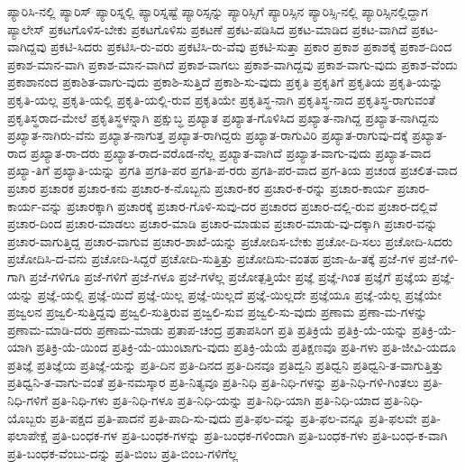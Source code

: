 {ಪ್ಯಾರಿಸಿ-ನಲ್ಲಿ
ಪ್ಯಾರಿಸ್
ಪ್ಯಾರಿಸ್ನಲ್ಲಿ
ಪ್ಯಾರಿಸ್ನಷ್ಟೆ
ಪ್ಯಾರಿಸ್ಸನ್ನು
ಪ್ಯಾರಿಸ್ಸಿಗೆ
ಪ್ಯಾರಿಸ್ಸಿನ
ಪ್ಯಾರಿಸ್ಸಿ-ನಲ್ಲಿ
ಪ್ಯಾರಿಸ್ಸಿನಲ್ಲಿದ್ದಾಗ
ಪ್ಯಾಲೇಸ್
ಪ್ರಕಟಗೊಳಿಸ-ಬೇಕು
ಪ್ರಕಟಗೊಳಿಸು
ಪ್ರಕಟಣೆ
ಪ್ರಕಟ-ಪಡಿಸಿದ
ಪ್ರಕಟ-ಮಾಡಿದ
ಪ್ರಕಟ-ವಾಗಿದೆ
ಪ್ರಕಟ-ವಾಗಿದ್ದವು
ಪ್ರಕಟಿ-ಸಿದರು
ಪ್ರಕಟಿಸಿ-ರು-ವರು
ಪ್ರಕಟಿಸಿ-ರು-ವೆವು
ಪ್ರಕಟಿ-ಸುತ್ತಾ
ಪ್ರಕಾರ
ಪ್ರಕಾಶ
ಪ್ರಕಾಶಕ್ಕೆ
ಪ್ರಕಾಶ-ದಿಂದ
ಪ್ರಕಾಶ-ಮಾನ-ವಾಗಿ
ಪ್ರಕಾಶ-ಮಾನ-ವಾಗಿದೆ
ಪ್ರಕಾಶ-ವಾಗಲು
ಪ್ರಕಾಶ-ವಾಗಿದ್ದವು
ಪ್ರಕಾಶ-ವಾಗು-ವುದು
ಪ್ರಕಾಶ-ವೆಂದು
ಪ್ರಕಾಶಾನಂದ
ಪ್ರಕಾಶಿತ-ವಾಗು-ವುದು
ಪ್ರಕಾಶಿ-ಸುತ್ತಿದೆ
ಪ್ರಕಾಶಿ-ಸು-ವುದು
ಪ್ರಕೃತಿ
ಪ್ರಕೃತಿಗೆ
ಪ್ರಕೃತಿಯ
ಪ್ರಕೃತಿ-ಯನ್ನು
ಪ್ರಕೃತಿ-ಯಲ್ಲ
ಪ್ರಕೃತಿ-ಯಲ್ಲಿ
ಪ್ರಕೃತಿ-ಯಲ್ಲಿ-ರುವ
ಪ್ರಕೃತಿಯೇ
ಪ್ರಕೃತಿಸ್ಥ-ನಾಗಿ
ಪ್ರಕೃತಿಸ್ಥ-ನಾದ
ಪ್ರಕೃತಿಸ್ಥ-ರಾಗುವಂತೆ
ಪ್ರಕೃತಿಸ್ಥರಾದ-ಮೇಲೆ
ಪ್ರಕೃತಿಸ್ಥಳನ್ನಾಗಿ
ಪ್ರಕ್ಷುಬ್ಧ
ಪ್ರಖ್ಯಾತ
ಪ್ರಖ್ಯಾತ-ಗೊಳಿಸಿದ
ಪ್ರಖ್ಯಾತ-ನಾಗಿದ್ದ
ಪ್ರಖ್ಯಾತ-ನಾಗಿದ್ದನು
ಪ್ರಖ್ಯಾತ-ನಾಗಿರು-ವೆನು
ಪ್ರಖ್ಯಾತ-ನಾಗುತ್ತ
ಪ್ರಖ್ಯಾತ-ರಾಗಿದ್ದರು
ಪ್ರಖ್ಯಾತ-ರಾಗುವಿರಿ
ಪ್ರಖ್ಯಾತ-ರಾಗುವು-ದಕ್ಕೆ
ಪ್ರಖ್ಯಾತ-ರಾದ
ಪ್ರಖ್ಯಾತ-ರಾ-ದರು
ಪ್ರಖ್ಯಾತ-ರಾದ-ವರೊಡ-ನೆಲ್ಲ
ಪ್ರಖ್ಯಾತ-ವಾಗಿದೆ
ಪ್ರಖ್ಯಾತ-ವಾಗು-ವುದು
ಪ್ರಖ್ಯಾತ-ವಾದ
ಪ್ರಖ್ಯಾ-ತಿಗೆ
ಪ್ರಖ್ಯಾತಿ-ಯನ್ನು
ಪ್ರಗತಿ
ಪ್ರಗತಿ-ಪರ
ಪ್ರಗತಿ-ಪ-ರರು
ಪ್ರಗತಿ-ಪರ-ವಾದ
ಪ್ರಗ-ತಿಯ
ಪ್ರಚಂಡ
ಪ್ರಚಲಿತ-ವಾದ
ಪ್ರಚಾರ
ಪ್ರಚಾರಕ
ಪ್ರಚಾರ-ಕನು
ಪ್ರಚಾರ-ಕ-ನೊಬ್ಬನು
ಪ್ರಚಾರ-ಕರ
ಪ್ರಚಾರ-ಕ-ರನ್ನು
ಪ್ರಚಾರ-ಕಾರ್ಯ
ಪ್ರಚಾರ-ಕಾರ್ಯ-ವನ್ನು
ಪ್ರಚಾರಕ್ಕಾಗಿ
ಪ್ರಚಾರಕ್ಕೆ
ಪ್ರಚಾರ-ಗೊಳಿ-ಸುವು-ದರ
ಪ್ರಚಾರದ
ಪ್ರಚಾರ-ದಲ್ಲಿ-ರುವ
ಪ್ರಚಾರ-ದಲ್ಲಿವೆ
ಪ್ರಚಾರ-ದಿಂದ
ಪ್ರಚಾರ-ಮಾಡಲು
ಪ್ರಚಾರ-ಮಾಡಿ
ಪ್ರಚಾರ-ಮಾಡುವ
ಪ್ರಚಾರ-ಮಾಡು-ವು-ದಕ್ಕಾಗಿ
ಪ್ರಚಾರ-ವನ್ನು
ಪ್ರಚಾರ-ವಾಗುತ್ತಿದ್ದ
ಪ್ರಚಾರ-ವಾಗುವ
ಪ್ರಚಾರ-ಶಾಖೆ-ಯನ್ನು
ಪ್ರಚೋದಿಸ-ಬೇಕು
ಪ್ರಚೋ-ದಿ-ಸಲು
ಪ್ರಚೋದಿ-ಸಿದರು
ಪ್ರಚೋದಿಸಿ-ದ-ವನು
ಪ್ರಚೋದಿ-ಸಿದ್ದರೆ
ಪ್ರಚೋದಿ-ಸುತ್ತಿತ್ತು
ಪ್ರಚೋದಿಸು-ವಂತಹ
ಪ್ರಜಾ-ಹಿ-ತಕ್ಕೆ
ಪ್ರಜೆ-ಗಳ
ಪ್ರಜೆ-ಗಳಿ-ಗಾಗಿ
ಪ್ರಜೆ-ಗಳಿಗೂ
ಪ್ರಜೆ-ಗಳಿಗೆ
ಪ್ರಜೆ-ಗಳೂ
ಪ್ರಜೆ-ಗಳೆಲ್ಲ
ಪ್ರಜೋತ್ಪತ್ತಿಯೇ
ಪ್ರಜ್ಞೆ
ಪ್ರಜ್ಞೆ-ಗಿಂತ
ಪ್ರಜ್ಞೆಗೆ
ಪ್ರಜ್ಞೆಯ
ಪ್ರಜ್ಞೆ-ಯನ್ನು
ಪ್ರಜ್ಞೆ-ಯಲ್ಲಿ
ಪ್ರಜ್ಞೆ-ಯಿದೆ
ಪ್ರಜ್ಞೆ-ಯಿಲ್ಲ
ಪ್ರಜ್ಞೆ-ಯಿಲ್ಲದೆ
ಪ್ರಜ್ಞೆ-ಯಿಲ್ಲದೇ
ಪ್ರಜ್ಞೆಯೂ
ಪ್ರಜ್ಞೆ-ಯೆಲ್ಲ
ಪ್ರಜ್ಞೆಯೇ
ಪ್ರಜ್ವಲನ
ಪ್ರಜ್ವಲಿ-ಸುತ್ತಿದ್ದವು
ಪ್ರಜ್ವಲಿ-ಸುತ್ತಿರುವ
ಪ್ರಜ್ವಲಿ-ಸುವ
ಪ್ರಜ್ವಲಿ-ಸು-ವುದು
ಪ್ರಣಾಮ
ಪ್ರಣಾ-ಮ-ಗಳನ್ನು
ಪ್ರಣಾಮ-ಮಾಡಿ-ದರು
ಪ್ರಣಾಮ-ಮಾಡು
ಪ್ರತಾಪ-ಚಂದ್ರ
ಪ್ರತಾಪಸಿಂಗ
ಪ್ರತಿ
ಪ್ರತಿಕ್ರಿಯೆ
ಪ್ರತಿಕ್ರಿ-ಯೆ-ಯನ್ನು
ಪ್ರತಿಕ್ರಿ-ಯೆ-ಯಾಗಿ
ಪ್ರತಿಕ್ರಿ-ಯೆ-ಯಿಂದ
ಪ್ರತಿಕ್ರಿ-ಯೆ-ಯುಂಟಾಗು-ವುದು
ಪ್ರತಿಕ್ರಿ-ಯೆಯೆ
ಪ್ರತಿಕ್ಷಣವೂ
ಪ್ರತಿ-ಗಳು
ಪ್ರತಿ-ಜೀವಿ-ಯದೂ
ಪ್ರತಿಜ್ಞೆ
ಪ್ರತಿಜ್ಞೆಯ
ಪ್ರತಿಜ್ಞೆ-ಯನ್ನು
ಪ್ರತಿ-ದಿನ
ಪ್ರತಿ-ದಿನದ
ಪ್ರತಿ-ದಿನವೂ
ಪ್ರತಿದ್ವನಿ
ಪ್ರತಿಧ್ವನಿ
ಪ್ರತಿಧ್ವನಿ-ತ-ವಾಗುತ್ತಿತ್ತು
ಪ್ರತಿಧ್ವನಿ-ತ-ವಾಗು-ವಂತೆ
ಪ್ರತಿ-ನಮಸ್ಕಾರ
ಪ್ರತಿ-ನಿತ್ಯವೂ
ಪ್ರತಿ-ನಿಧಿ
ಪ್ರತಿ-ನಿಧಿ-ಗಳನ್ನು
ಪ್ರತಿ-ನಿಧಿ-ಗಳಿ-ಗಿಂತಲು
ಪ್ರತಿ-ನಿಧಿ-ಗಳಿಗೆ
ಪ್ರತಿ-ನಿಧಿ-ಗಳು
ಪ್ರತಿ-ನಿಧಿ-ಗಳೂ
ಪ್ರತಿ-ನಿಧಿ-ಯನ್ನು
ಪ್ರತಿ-ನಿಧಿ-ಯಾಗಿ
ಪ್ರತಿ-ನಿಧಿ-ಯಾದ
ಪ್ರತಿ-ನಿಧಿ-ಯೊಬ್ಬರು
ಪ್ರತಿ-ಪಕ್ಷದ
ಪ್ರತಿ-ಪಾದನೆ
ಪ್ರತಿ-ಪಾದಿ-ಸು-ವುದು
ಪ್ರತಿ-ಫಲ-ವನ್ನು
ಪ್ರತಿ-ಫಲ-ವನ್ನೂ
ಪ್ರತಿ-ಫಲವೇ
ಪ್ರತಿ-ಫಲಾಪೇಕ್ಷೆ
ಪ್ರತಿ-ಬಂಧಕ-ಗಳ
ಪ್ರತಿ-ಬಂಧಕ-ಗಳನ್ನು
ಪ್ರತಿ-ಬಂಧಕ-ಗಳಿಂದಾಗಿ
ಪ್ರತಿ-ಬಂಧಕ-ಗಳು
ಪ್ರತಿ-ಬಂಧ-ಕ-ವಾಗಿ
ಪ್ರತಿ-ಬಂಧಕ-ವೆಂಬು-ದನ್ನು
ಪ್ರತಿ-ಬಿಂಬ
ಪ್ರತಿ-ಬಿಂಬ-ಗಳಿಗೆಲ್ಲ
}
